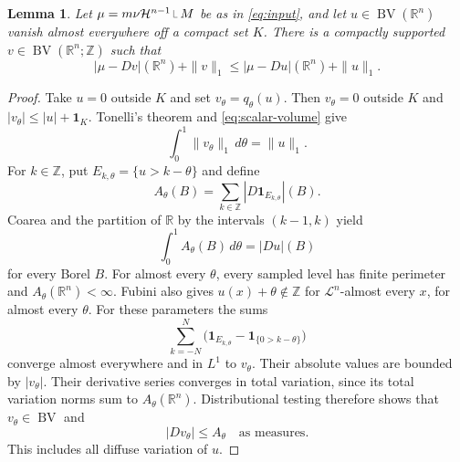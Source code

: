 \documentclass[11pt]{article}
\newtheorem{lemma}[theorem]{Lemma}
\newcommand{\R}{\mathbb R}
\newcommand{\Z}{\mathbb Z}
\newcommand{\HH}{\mathcal H}
\newcommand{\LL}{\mathcal L}
\newcommand{\restr}{\mathbin{\vrule height 1.4ex depth 0pt width .07ex\vrule height .07ex depth 0pt width .65ex}}
\newcommand{\BV}{\operatorname{BV}}
\begin{document}
\begin{lemma}\label{lem:round}
Let $\mu=m\nu\HH^{n-1}\restr M$ be as in \eqref{eq:input}, and let
$u\in\BV(\R^n)$ vanish almost everywhere off a compact set $K$.
There is a compactly supported $v\in\BV(\R^n;\Z)$ such that
\begin{equation}\label{eq:cost}
|\mu-Dv|(\R^n)+\|v\|_1
\le |\mu-Du|(\R^n)+\|u\|_1.
\end{equation}
\end{lemma}
\begin{proof}
Take $u=0$ outside $K$ and set $v_\theta=q_\theta(u)$.
Then $v_\theta=0$ outside $K$ and $|v_\theta|\le|u|+\mathbf1_K$.
Tonelli's theorem and \eqref{eq:scalar-volume} give
\begin{equation}\label{eq:mean-volume}
\int_0^1\|v_\theta\|_1\,d\theta=\|u\|_1.
\end{equation}
For $k\in\Z$, put $E_{k,\theta}=\{u>k-\theta\}$ and define
\[
A_\theta(B)=\sum_{k\in\Z}|D\mathbf1_{E_{k,\theta}}|(B).
\]
Coarea and the partition of $\R$ by the intervals $(k-1,k)$ yield
\begin{equation}\label{eq:sample-coarea}
\int_0^1 A_\theta(B)\,d\theta=|Du|(B)
\end{equation}
for every Borel $B$. For almost every $\theta$, every sampled level has
finite perimeter and $A_\theta(\R^n)<\infty$. Fubini also gives
$u(x)+\theta\notin\Z$ for $\LL^n$-almost every $x$, for almost every $\theta$.
For these parameters the sums
\[
\sum_{k=-N}^N
\bigl(\mathbf1_{E_{k,\theta}}-\mathbf1_{\{0>k-\theta\}}\bigr)
\]
converge almost everywhere and in $L^1$ to $v_\theta$. Their absolute values
are bounded by $|v_\theta|$. Their derivative series converges in total
variation, since its total variation norms sum to $A_\theta(\R^n)$.
Distributional testing therefore shows that $v_\theta\in\BV$ and
\begin{equation}\label{eq:variation}
|Dv_\theta|\le A_\theta\quad\text{as measures}.
\end{equation}
This includes all diffuse variation of $u$.


\end{proof}
\end{document}
